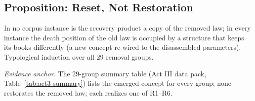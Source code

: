\subsection{Proposition: Reset, Not Restoration}\label{sec:act2-proposition}

\begin{proposition}
In no corpus instance is the recovery product a copy of the removed
law; in every instance the death position of the old law is occupied
by a structure that keeps its books differently (a new concept
re-wired to the disassembled parameters). Typological induction over
all 29 removal groups.
\end{proposition}

\noindent\emph{Evidence anchor.} The 29-group summary table (Act III
data pack, Table~\ref{tab:act3-summary}) lists the emerged concept
for every group; none restorates the removed law; each realizes one
of R1--R6.
